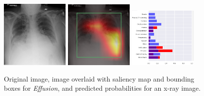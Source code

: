 \documentclass[8pt]{beamer}
\begin{document}
\begin{frame}
\begin{figure}[H]
  \centering
  \includegraphics[width=0.3\textwidth]{images/preds/effusion}\hspace{0.01\textwidth}%
  \includegraphics[width=0.3\textwidth]{images/preds/effusion_cam}\hspace{0.01\textwidth}%
  \includegraphics[width=0.3\textwidth]{images/preds/effusion_probs}\\[0.01\textwidth]
  \caption{Original image, image overlaid with saliency map and bounding boxes
    for \emph{Effusion}, and predicted probabilities for an x-ray image.}
  \label{examples_3}
\end{figure}
\end{frame}
\end{document}
